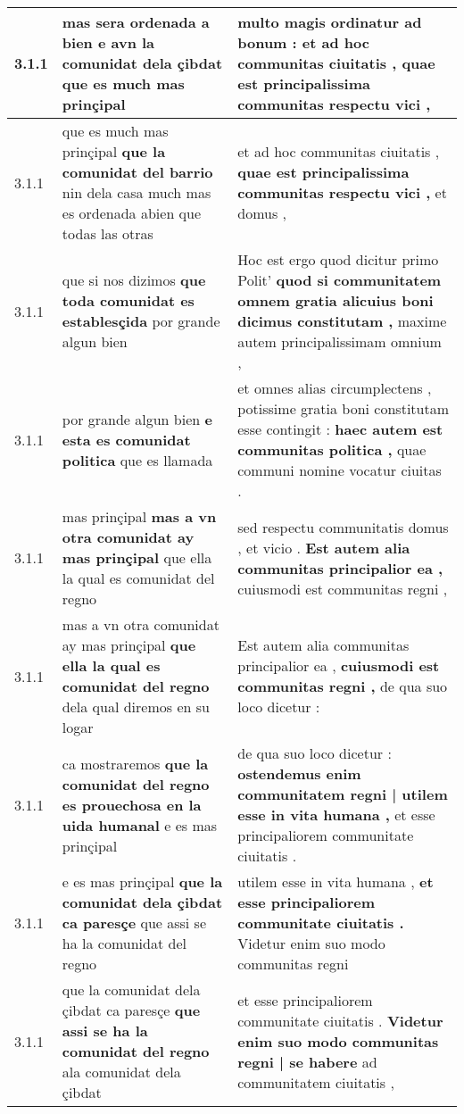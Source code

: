 \begin{tabular}{|p{1cm}|p{6.5cm}|p{6.5cm}|}
3.1.1 & mas sera ordenada a bien \textbf{ e avn la comunidat dela çibdat } que es much mas prinçipal & multo magis ordinatur ad bonum : \textbf{ et ad hoc communitas ciuitatis , } quae est principalissima communitas respectu vici , \\\hline
3.1.1 & que es much mas prinçipal \textbf{ que la comunidat del barrio } nin dela casa much mas es ordenada abien que todas las otras & et ad hoc communitas ciuitatis , \textbf{ quae est principalissima communitas respectu vici , } et domus , \\\hline
3.1.1 & que si nos dizimos \textbf{ que toda comunidat es establesçida } por grande algun bien & Hoc est ergo quod dicitur primo Polit’ \textbf{ quod si communitatem omnem gratia alicuius boni dicimus constitutam , } maxime autem principalissimam omnium , \\\hline
3.1.1 & por grande algun bien \textbf{ e esta es comunidat politica } que es llamada & et omnes alias circumplectens , potissime gratia boni constitutam esse contingit : \textbf{ haec autem est communitas politica , } quae communi nomine vocatur ciuitas . \\\hline
3.1.1 & mas prinçipal \textbf{ mas a vn otra comunidat ay mas prinçipal } que ella la qual es comunidat del regno & sed respectu communitatis domus , et vicio . \textbf{ Est autem alia communitas principalior ea , } cuiusmodi est communitas regni , \\\hline
3.1.1 & mas a vn otra comunidat ay mas prinçipal \textbf{ que ella la qual es comunidat del regno } dela qual diremos en su logar & Est autem alia communitas principalior ea , \textbf{ cuiusmodi est communitas regni , } de qua suo loco dicetur : \\\hline
3.1.1 & ca mostraremos \textbf{ que la comunidat del regno es prouechosa en la uida humanal } e es mas prinçipal & de qua suo loco dicetur : \textbf{ ostendemus enim communitatem regni | utilem esse in vita humana , } et esse principaliorem communitate ciuitatis . \\\hline
3.1.1 & e es mas prinçipal \textbf{ que la comunidat dela çibdat ca paresçe } que assi se ha la comunidat del regno & utilem esse in vita humana , \textbf{ et esse principaliorem communitate ciuitatis . } Videtur enim suo modo communitas regni \\\hline
3.1.1 & que la comunidat dela çibdat ca paresçe \textbf{ que assi se ha la comunidat del regno } ala comunidat dela çibdat & et esse principaliorem communitate ciuitatis . \textbf{ Videtur enim suo modo communitas regni | se habere } ad communitatem ciuitatis , \\\hline

\end{tabular}
